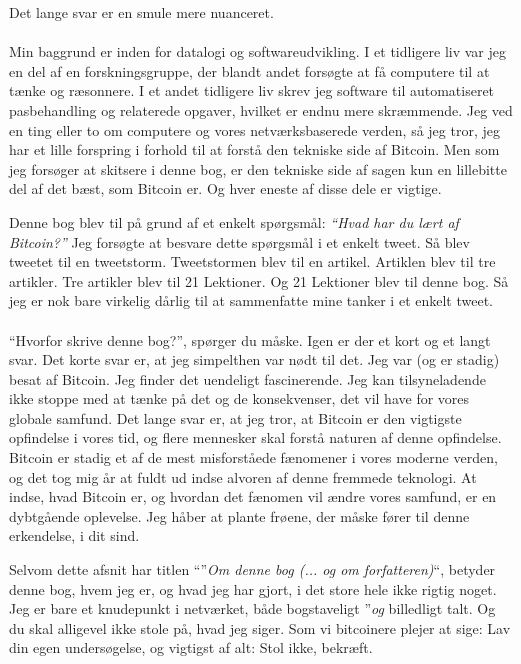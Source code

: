 \documentclass[paper=6in:9in,pagesize=pdftex,
               headinclude=on,footinclude=on,12pt]{scrbook}
\begin{document}
Det lange svar er en smule mere nuanceret.\paragraph{} Min baggrund er inden for datalogi og softwareudvikling. I et tidligere liv var jeg en del af en forskningsgruppe, der blandt andet forsøgte at få computere til at tænke og ræsonnere. I et andet tidligere liv skrev jeg software til automatiseret pasbehandling og relaterede opgaver, hvilket er endnu mere skræmmende. Jeg ved en ting eller to om computere og vores netværksbaserede verden, så jeg tror, jeg har et lille forspring i forhold til at forstå den tekniske side af Bitcoin. Men som jeg forsøger at skitsere i denne bog, er den tekniske side af sagen kun en lillebitte del af det bæst, som Bitcoin er. Og hver eneste af disse dele er vigtige.

Denne bog blev til på grund af et enkelt spørgsmål: \textit{\enquote{Hvad har du lært af Bitcoin?}} Jeg forsøgte at besvare dette spørgsmål i et enkelt tweet. Så blev tweetet til en tweetstorm. Tweetstormen blev til en artikel. Artiklen blev til tre artikler. Tre artikler blev til 21 Lektioner. Og 21 Lektioner blev til denne bog. Så jeg er nok bare virkelig dårlig til at sammenfatte mine tanker i et enkelt tweet.\paragraph{} \enquote{Hvorfor skrive denne bog?}, spørger du måske. Igen er der et kort og et langt svar. Det korte svar er, at jeg simpelthen var nødt til det. Jeg var (og er stadig) besat af Bitcoin. Jeg finder det uendeligt fascinerende. Jeg kan tilsyneladende ikke stoppe med at tænke på det og de konsekvenser, det vil have for vores globale samfund. Det lange svar er, at jeg tror, at Bitcoin er den vigtigste opfindelse i vores tid, og flere mennesker skal forstå naturen af denne opfindelse. Bitcoin er stadig et af de mest misforståede fænomener i vores moderne verden, og det tog mig år at fuldt ud indse alvoren af denne fremmede teknologi. At indse, hvad Bitcoin er, og hvordan det fænomen vil ændre vores samfund, er en dybtgående oplevelse. Jeg håber at plante frøene, der måske fører til denne erkendelse, i dit sind.

Selvom dette afsnit har titlen \enquote{}\textit{Om denne bog (... og om forfatteren)}\enquote{, betyder denne bog, hvem jeg er, og hvad jeg har gjort, i det store hele ikke rigtig noget. Jeg er bare et knudepunkt i netværket, både bogstaveligt }\textit{og} billedligt talt. Og du skal alligevel ikke stole på, hvad jeg siger. Som vi bitcoinere plejer at sige: Lav din egen undersøgelse, og vigtigst af alt: Stol ikke, bekræft.
\end{document}
